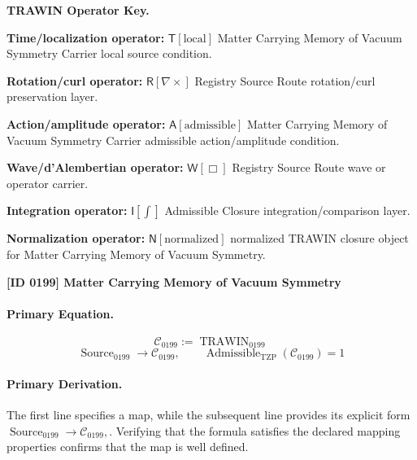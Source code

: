 \par\vspace{0.45\baselineskip}
\noindent\begin{minipage}[t]{\linewidth}
\begingroup
\small
\raggedright
\textbf{TRAWIN Operator Key.}\par
\noindent\textbf{Time/localization operator:} $\mathsf{T}\!\left[\mathrm{local}\right]$ Matter Carrying Memory of Vacuum Symmetry Carrier local source condition.\par
\noindent\textbf{Rotation/curl operator:} $\mathsf{R}\!\left[\nabla\times\right]$ Registry Source Route rotation/curl preservation layer.\par
\noindent\textbf{Action/amplitude operator:} $\mathsf{A}\!\left[\mathrm{admissible}\right]$ Matter Carrying Memory of Vacuum Symmetry Carrier admissible action/amplitude condition.\par
\noindent\textbf{Wave/d'Alembertian operator:} $\mathsf{W}\!\left[\Box\right]$ Registry Source Route wave or operator carrier.\par
\noindent\textbf{Integration operator:} $\mathsf{I}\!\left[\int\right]$ Admissible Closure integration/comparison layer.\par
\noindent\textbf{Normalization operator:} $\mathsf{N}\!\left[\mathrm{normalized}\right]$ normalized TRAWIN closure object for Matter Carrying Memory of Vacuum Symmetry.\par
\endgroup
\end{minipage}

\clearpage
\noindent\textbf{[ID 0199] Matter Carrying Memory of Vacuum Symmetry}\par
\vspace{0.35em}
\paragraph{Primary Equation.}
\[
\mathcal{C}_{0199} := \operatorname{TRAWIN}_{0199}
\]
\[
\operatorname{Source}_{0199}\longrightarrow \mathcal{C}_{0199},
\qquad
\operatorname{Admissible}_{\mathrm{TZP}}\!\left(\mathcal{C}_{0199}\right)=1
\]

\paragraph{Primary Derivation.}
The first line specifies a map, while the subsequent line provides its explicit form \( \operatorname{Source}_{0199}\longrightarrow \mathcal{C}_{0199}, \). Verifying that the formula satisfies the declared mapping properties confirms that the map is well defined.
